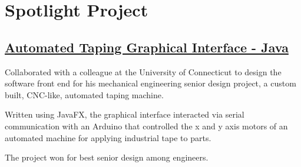 \documentclass[letterpaper]{fowles-resume} %
\begin{document}
\begin{minipage}[t]{0.66\textwidth}
\section{Spotlight Project}
\subsection{\href{https://github.com/acf5118/AutomatedTapingGUI}{Automated Taping Graphical Interface - Java}}
\begin{tightitemize}
\item Collaborated with a colleague at the University of Connecticut to design the software front end for his mechanical engineering senior design project, a custom built, CNC-like, automated taping machine.
\item Written using JavaFX, the graphical interface interacted via serial communication with an Arduino that controlled the x and y axis motors of an automated machine for applying industrial tape to parts. 
\item The project won for best senior design among engineers. 
\end{tightitemize}
\sectionspace
\end{minipage}
\end{document}
